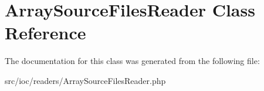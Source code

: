 \hypertarget{class_array_source_files_reader}{\section{Array\-Source\-Files\-Reader Class Reference}
\label{class_array_source_files_reader}
}


The documentation for this class was generated from the following file\-:\begin{DoxyCompactItemize}
\item 
src/ioc/readers/Array\-Source\-Files\-Reader.\-php\end{DoxyCompactItemize}
